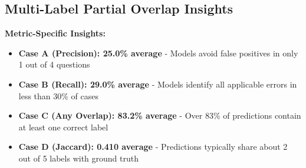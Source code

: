 \documentclass[12pt,a4paper]{article}
\begin{document}
    
    
    

    
    
    

\subsection{Multi-Label Partial Overlap Insights}

\textbf{Metric-Specific Insights:}
\begin{itemize}[leftmargin=*]
    \item \textbf{Case A (Precision): 25.0\% average} - Models avoid false positives in only 1 out of 4 questions
    
    \item \textbf{Case B (Recall): 29.0\% average} - Models identify all applicable errors in less than 30\% of cases
    
    \item \textbf{Case C (Any Overlap): 83.2\% average} - Over 83\% of predictions contain at least one correct label
    
    \item \textbf{Case D (Jaccard): 0.410 average} - Predictions typically share about 2 out of 5 labels with ground truth
\end{itemize}
\end{document}
